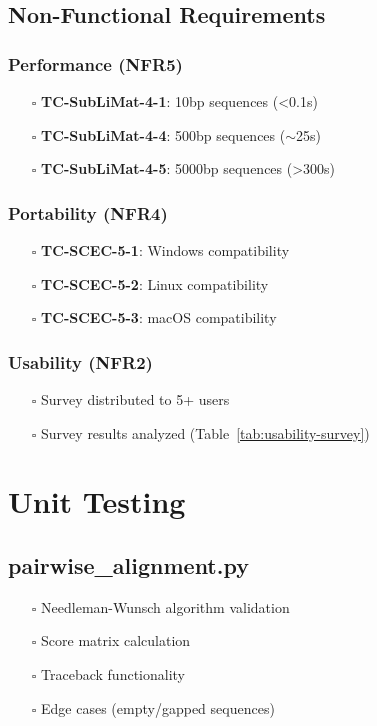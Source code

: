 \documentclass{article}
\begin{document}
\subsection*{Non-Functional Requirements}
\subsubsection*{Performance (NFR5)}
\begin{itemize}[leftmargin=*]
    \item[$\square$] \textbf{TC-SubLiMat-4-1}: 10bp sequences (<0.1s)
    \item[$\square$] \textbf{TC-SubLiMat-4-4}: 500bp sequences ($\sim$25s)
    \item[$\square$] \textbf{TC-SubLiMat-4-5}: 5000bp sequences (>300s)
\end{itemize}

\subsubsection*{Portability (NFR4)}
\begin{itemize}[leftmargin=*]
    \item[$\square$] \textbf{TC-SCEC-5-1}: Windows compatibility
    \item[$\square$] \textbf{TC-SCEC-5-2}: Linux compatibility  
    \item[$\square$] \textbf{TC-SCEC-5-3}: macOS compatibility
\end{itemize}

\subsubsection*{Usability (NFR2)}
\begin{itemize}[leftmargin=*]
    \item[$\square$] Survey distributed to 5+ users
    \item[$\square$] Survey results analyzed (Table~\ref{tab:usability-survey})  %
\end{itemize}

\section*{Unit Testing}
\subsection*{pairwise\_alignment.py}
\begin{itemize}[leftmargin=*]
    \item[$\square$] Needleman-Wunsch algorithm validation
    \item[$\square$] Score matrix calculation
    \item[$\square$] Traceback functionality
    \item[$\square$] Edge cases (empty/gapped sequences)
\end{itemize}
\end{document}

